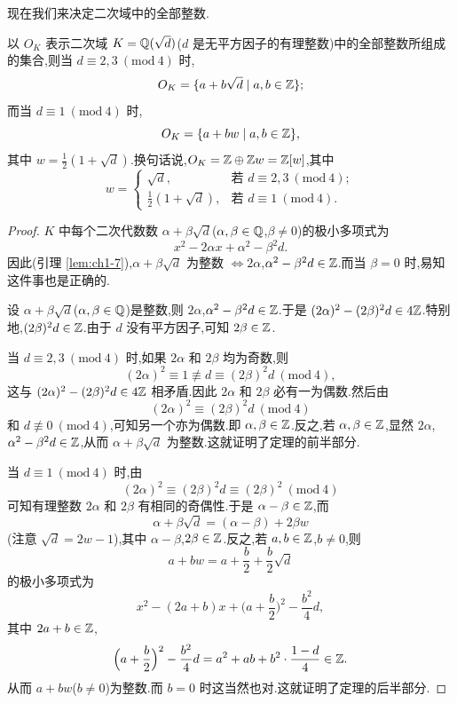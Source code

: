 现在我们来决定二次域中的全部整数.

\begin{theorem}\label{thm:1.7}
以 $O_K$ 表示二次域 $K=\mathbb{Q}(\sqrt{d})$($d$ 是无平方因子的有理整数)中的全部整数所组成的集合,则当 $d\equiv 2,3\ (\mathrm{mod}\ 4)$ 时,
\[
  O_K=\{a+b\sqrt{d}\mid a,b\in\mathbb{Z}\};
\]
而当 $d\equiv 1\ (\mathrm{mod}\ 4)$ 时,
\[
  O_K=\{a+bw\mid a,b\in\mathbb{Z}\},
\]
其中 $w=\frac{1}{2}(1+\sqrt{d})$.换句话说,$O_K=\mathbb{Z}\oplus\mathbb{Z} w=\mathbb{Z}[w]$,其中
\[
  w=\begin{cases}
    \sqrt{d}, & \text{若 } d\equiv 2,3\ (\mathrm{mod}\ 4);\\[2pt]
    \frac{1}{2}(1+\sqrt{d}), & \text{若 } d\equiv 1\ (\mathrm{mod}\ 4).
  \end{cases}
\]
\end{theorem}

\begin{proof}
$K$ 中每个二次代数数 $\alpha+\beta\sqrt{d}$($\alpha,\beta\in\mathbb{Q}$,$\beta\neq 0$)的极小多项式为
\[
  x^2-2\alpha x+\alpha^2-\beta^2d.
\]
因此(引理 \ref{lem:ch1-7}),$\alpha+\beta\sqrt{d}$ 为整数 $\iff 2\alpha$,$\alpha^2-\beta^2d\in\mathbb{Z}$.而当 $\beta=0$ 时,易知这件事也是正确的.

设 $\alpha+\beta\sqrt{d}$($\alpha,\beta\in\mathbb{Q}$)是整数,则 $2\alpha$,$\alpha^2-\beta^2d\in\mathbb{Z}$.于是 $(2\alpha)^2-(2\beta)^2d\in 4\mathbb{Z}$.特别地,$(2\beta)^2d\in\mathbb{Z}$.由于 $d$ 没有平方因子,可知 $2\beta\in\mathbb{Z}$.

当 $d\equiv 2,3\ (\mathrm{mod}\ 4)$ 时,如果 $2\alpha$ 和 $2\beta$ 均为奇数,则
\[
  (2\alpha)^2\equiv 1\not\equiv d\equiv (2\beta)^2d\ (\mathrm{mod}\ 4),
\]
这与 $(2\alpha)^2-(2\beta)^2d\in 4\mathbb{Z}$ 相矛盾.因此 $2\alpha$ 和 $2\beta$ 必有一为偶数.然后由
\[
  (2\alpha)^2\equiv(2\beta)^2d\ (\mathrm{mod}\ 4)
\]
和 $d\not\equiv 0\ (\mathrm{mod}\ 4)$,可知另一个亦为偶数.即 $\alpha,\beta\in\mathbb{Z}$.反之,若 $\alpha,\beta\in\mathbb{Z}$,显然 $2\alpha$,$\alpha^2-\beta^2d\in\mathbb{Z}$,从而 $\alpha+\beta\sqrt{d}$ 为整数.这就证明了定理的前半部分.

当 $d\equiv 1\ (\mathrm{mod}\ 4)$ 时,由
\[
  (2\alpha)^2\equiv(2\beta)^2d\equiv(2\beta)^2\ (\mathrm{mod}\ 4)
\]
可知有理整数 $2\alpha$ 和 $2\beta$ 有相同的奇偶性.于是 $\alpha-\beta\in\mathbb{Z}$,而
\[
  \alpha+\beta\sqrt{d}=(\alpha-\beta)+2\beta w
\]
(注意 $\sqrt{d}=2w-1$),其中 $\alpha-\beta$,$2\beta\in\mathbb{Z}$.反之,若 $a,b\in\mathbb{Z}$,$b\neq 0$,则
\[
  a+bw=a+\frac{b}{2}+\frac{b}{2}\sqrt{d}
\]
的极小多项式为
\[
  x^2-(2a+b)x+\Big(a+\frac{b}{2}\Big)^2-\frac{b^2}{4}d,
\]
其中 $2a+b\in\mathbb{Z}$,
\[
  \Big(a+\frac{b}{2}\Big)^2-\frac{b^2}{4}d=a^2+ab+b^2\cdot\frac{1-d}{4}\in\mathbb{Z}.
\]
从而 $a+bw$($b\neq 0$)为整数.而 $b=0$ 时这当然也对.这就证明了定理的后半部分.
\end{proof}

